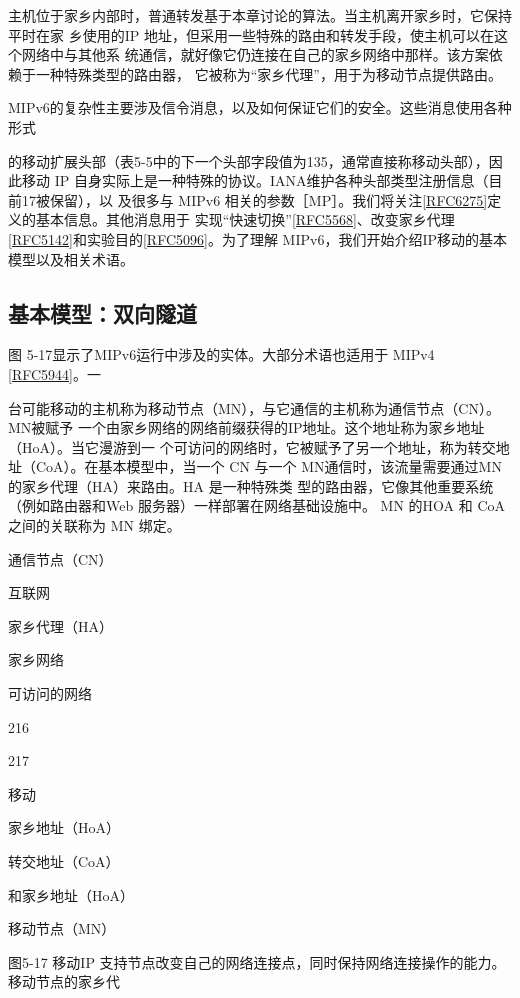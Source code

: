 主机位于家乡内部时，普通转发基于本章讨论的算法。当主机离开家乡时，它保持平时在家
乡使用的IP 地址，但采用一些特殊的路由和转发手段，使主机可以在这个网络中与其他系
统通信，就好像它仍连接在自己的家乡网络中那样。该方案依赖于一种特殊类型的路由器，
它被称为“家乡代理”，用于为移动节点提供路由。

MIPv6的复杂性主要涉及信令消息，以及如何保证它们的安全。这些消息使用各种形式

的移动扩展头部（表5-5中的下一个头部字段值为135，通常直接称移动头部），因此移动
IP 自身实际上是一种特殊的协议。IANA维护各种头部类型注册信息（目前17被保留），以
及很多与 MIPv6 相关的参数［MP］。我们将关注\href{https://www.rfc-editor.org/rfc/rfc6275}{[RFC6275]}定义的基本信息。其他消息用于
实现“快速切换”\href{https://www.rfc-editor.org/rfc/rfc5568}{[RFC5568]}、改变家乡代理\href{https://www.rfc-editor.org/rfc/rfc5142}{[RFC5142]}和实验目的\href{https://www.rfc-editor.org/rfc/rfc5096}{[RFC5096]}。为了理解
MIPv6，我们开始介绍IP移动的基本模型以及相关术语。

\subsection{基本模型：双向隧道}
图 5-17显示了MIPv6运行中涉及的实体。大部分术语也适用于 MIPv4 \href{https://www.rfc-editor.org/rfc/rfc5944}{[RFC5944]}。一

台可能移动的主机称为移动节点（MN），与它通信的主机称为通信节点（CN）。MN被赋予
一个由家乡网络的网络前缀获得的IP地址。这个地址称为家乡地址（HoA）。当它漫游到一
个可访问的网络时，它被赋予了另一个地址，称为转交地址（CoA）。在基本模型中，当一个
CN 与一个 MN通信时，该流量需要通过MN 的家乡代理（HA）来路由。HA 是一种特殊类
型的路由器，它像其他重要系统（例如路由器和Web 服务器）一样部署在网络基础设施中。
MN 的HOA 和 CoA之间的关联称为 MN 绑定。

通信节点（CN）

互联网

家乡代理（HA）

家乡网络

可访问的网络

216

217

移动

家乡地址（HoA）

转交地址（CoA）

和家乡地址（HoA）

移动节点（MN）

图5-17 移动IP 支持节点改变自己的网络连接点，同时保持网络连接操作的能力。移动节点的家乡代

